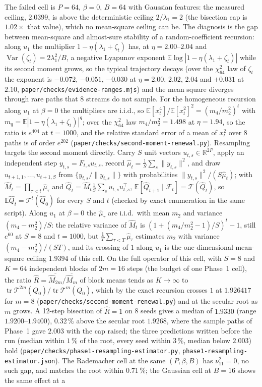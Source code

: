 \documentclass[11pt]{article}
\theoremstyle{remark}
\newcommand{\E}{\mathbb{E}}
\newcommand{\R}{\mathbb{R}}
\newcommand{\Var}{\operatorname{Var}}
\newcommand{\tr}{\operatorname{tr}}
\begin{document}
The failed cell is $P=64$, $\beta=0$, $B=64$ with Gaussian features: the measured ceiling, $2.0399$, is above the deterministic ceiling $2/\lambda_1=2$ (the bisection cap is $1.02\times$ that value), which no mean-square ceiling can be. The diagnosis is the gap between mean-square and almost-sure stability of a random-coefficient recursion: along $u_1$ the multiplier $1-\eta(\lambda_1+\zeta_t)$ has, at $\eta=2.00$--$2.04$ and $\Var(\zeta_t)=2\lambda_1^2/B$, a negative Lyapunov exponent $\E\log|1-\eta(\lambda_1+\zeta_t)|$ while its second moment grows, so the typical trajectory decays (over the $\chi^2_{64}$ law of $\zeta_t$ the exponent is $-0.072$, $-0.051$, $-0.030$ at $\eta=2.00$, $2.02$, $2.04$ and $+0.031$ at $2.10$, \texttt{paper/checks/evidence-ranges.mjs}) and the mean square diverges through rare paths that 8 streams do not sample. For the homogeneous recursion along $u_1$ at $\beta=0$ the multipliers are i.i.d., so $\E[x_t^4]/\E[x_t^2]^2=(m_4/m_2^2)^t$ with $m_q=\E|1-\eta(\lambda_1+\zeta_t)|^q$; over the $\chi^2_{64}$ law $m_4/m_2^2=1.498$ at $\eta=1.94$, so the ratio is $e^{404}$ at $t=1000$, and the relative standard error of a mean of $x_t^2$ over 8 paths is of order $e^{202}$ (\texttt{paper/checks/second-moment-renewal.py}). Resampling targets the second moment directly. Carry $S$ unit vectors $u_{t,s}\in\R^{2P}$, apply an independent step $y_{t,s}=F_{t,s}u_{t,s}$, record $\hat\mu_t=\frac1S\sum_s\|y_{t,s}\|^2$, and draw $u_{t+1,1},\dots,u_{t+1,S}$ from $\{y_{t,s}/\|y_{t,s}\|\}$ with probabilities $\|y_{t,s}\|^2/(S\hat\mu_t)$; with $\widehat M_t=\prod_{\tau<t}\hat\mu_\tau$ and $\widehat Q_t=\widehat M_t\frac1S\sum_su_{t,s}u_{t,s}^\top$, $\E[\widehat Q_{t+1}\mid\mathcal F_t]=\mathcal T(\widehat Q_t)$, so $\E\widehat Q_t=\mathcal T^t(\widehat Q_0)$ for every $S$ and $t$ (checked by exact enumeration in the same script). Along $u_1$ at $\beta=0$ the $\hat\mu_\tau$ are i.i.d.\ with mean $m_2$ and variance $(m_4-m_2^2)/S$: the relative variance of $\widehat M_t$ is $(1+(m_4/m_2^2-1)/S)^t-1$, still $e^{60}$ at $S=8$ and $t=1000$, but $\frac1T\sum_{\tau<T}\hat\mu_\tau$ estimates $m_2$ with variance $(m_4-m_2^2)/(ST)$, and its crossing of $1$ along $u_1$ is the one-dimensional mean-square ceiling $1.9394$ of this cell. On the full operator of this cell, with $S=8$ and $K=64$ independent blocks of $2m=16$ steps (the budget of one Phase~1 cell), the ratio $\widehat R=\overline{\widehat M_{2m}}/\overline{\widehat M_m}$ of block means tends as $K\to\infty$ to $\tr\mathcal T^{2m}(Q_0)/\tr\mathcal T^m(Q_0)$, which by the exact recursion crosses $1$ at $1.926417$ for $m=8$ (\texttt{paper/checks/second-moment-renewal.py}) and at the secular root as $m$ grows. A 12-step bisection of $\widehat R=1$ on 8 seeds gives a median of $1.9330$ (range $1.9200$--$1.9400$), $0.32\,\%$ above the secular root $1.9268$, where the sample paths of Phase~1 gave $2.003$ with the cap raised; the three predictions written before the run (median within $1\,\%$ of the root, every seed within $3\,\%$, median below $2.003$) hold (\texttt{paper/checks/phase1-resampling-estimator.py}, \texttt{phase1-resampling-estimator.json}). The Rademacher cell at the same $(P,\beta,B)$ has $\nu_{11}^2=0$, no such gap, and matches the root within $0.71\,\%$; the Gaussian cell at $B=16$ shows the same effect at a 
\end{document}
